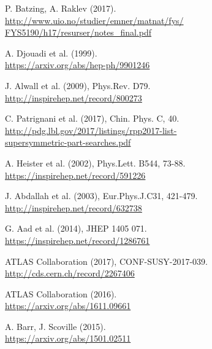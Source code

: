 \documentclass[twocolumn,a4paper,10pt]{article}
\begin{document}
\begin{thebibliography}{9}


  P. Batzing, A. Raklev (2017). \\
  \href{http://www.uio.no/studier/emner/matnat/fys/FYS5190/h17/resurser/notes\_final.pdf}
  {http://www.uio.no/studier/emner/matnat/fys/\\FYS5190/h17/resurser/notes\_final.pdf} 

  A. Djouadi et al. (1999). \\
  \href{https://arxiv.org/abs/hep-ph/9901246}{https://arxiv.org/abs/hep-ph/9901246}

  J. Alwall et al. (2009), Phys.Rev. D79. \\
  \href{http://inspirehep.net/record/800273}{http://inspirehep.net/record/800273}

  C. Patrignani et al. (2017), Chin. Phys. C, 40. \\ 
  \href{http://pdg.lbl.gov/2017/listings/rpp2017-list-supersymmetric-part-searches.pdf}
  {http://pdg.lbl.gov/2017/listings/rpp2017-list-\\supersymmetric-part-searches.pdf}	

  A. Heister et al. (2002), Phys.Lett. B544, 73-88. 
  \href{https://inspirehep.net/record/591226}{https://inspirehep.net/record/591226}
 
  J. Abdallah et al. (2003), Eur.Phys.J.C31, 421-479. 
  \href{http://inspirehep.net/record/632738}{http://inspirehep.net/record/632738}	

  G. Aad et al. (2014), JHEP 1405 071. \\
  \href{https://inspirehep.net/record/1286761}{https://inspirehep.net/record/1286761}

  ATLAS Collaboration (2017), CONF-SUSY-2017-039. 
  \href{http://cds.cern.ch/record/2267406}{http://cds.cern.ch/record/2267406}      

  ATLAS Collaboration (2016). \\
  \href{https://arxiv.org/abs/1611.09661}{https://arxiv.org/abs/1611.09661}   

  A. Barr, J. Scoville (2015). \\ 
  \href{https://arxiv.org/abs/1501.02511}{https://arxiv.org/abs/1501.02511}
 
\end{thebibliography}
\end{document}

